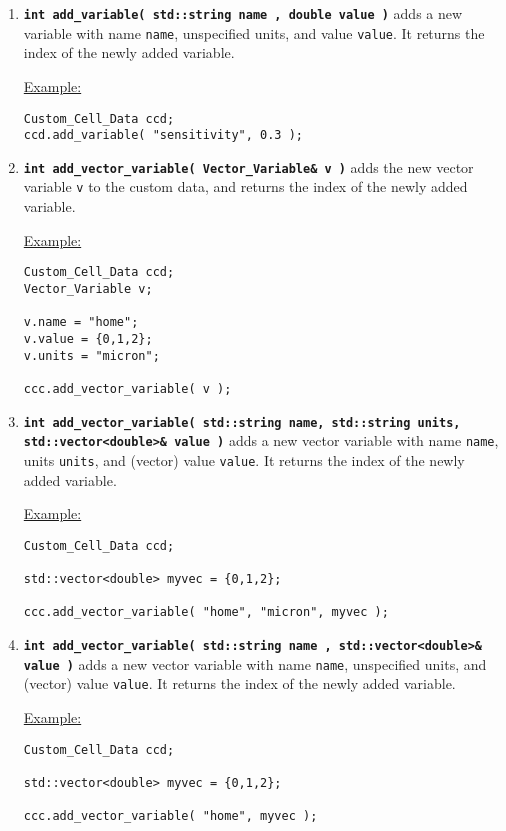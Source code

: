 \documentclass[12pt]{article}
\renewcommand{\v}{\verb}
\newcommand{\smallcode}[1]{\textbf{\texttt{#1}}}
\begin{document}
\begin{enumerate}
\item 
\smallcode{int add\_variable( std::string name , double value )}
adds a new variable with name \v|name|, unspecified units, and value \v|value|. It 
returns the index of the newly added variable. 
       
\underline{Example:} 
\begin{verbatim}
Custom_Cell_Data ccd; 
ccd.add_variable( "sensitivity", 0.3 ); 
\end{verbatim}
   
\item 
\smallcode{int add\_vector\_variable( Vector\_Variable\& v )} adds the new vector variable \v|v| to the 
custom data, and returns the index of the newly added variable. 

\underline{Example:} 
\begin{verbatim}
Custom_Cell_Data ccd; 
Vector_Variable v; 

v.name = "home"; 
v.value = {0,1,2}; 
v.units = "micron"; 

ccc.add_vector_variable( v ); 
\end{verbatim}

\item 
\smallcode{int add\_vector\_variable( std::string name, std::string units, \\
\phantom{int }std::vector<double>\& value )} 
adds a new vector variable with name \v|name|, units \v|units|, and (vector) value \v|value|. It 
returns the index of the newly added variable. 

\underline{Example:} 
\begin{verbatim}
Custom_Cell_Data ccd; 

std::vector<double> myvec = {0,1,2}; 

ccc.add_vector_variable( "home", "micron", myvec ); 
\end{verbatim}

\item 
\smallcode{int add\_vector\_variable( std::string name , std::vector<double>\& value )}
adds a new vector variable with name \v|name|, unspecified units, and (vector) value \v|value|. It 
returns the index of the newly added variable. 
       
\underline{Example:} 
\begin{verbatim}
Custom_Cell_Data ccd; 

std::vector<double> myvec = {0,1,2}; 

ccc.add_vector_variable( "home", myvec ); 
\end{verbatim}


\end{enumerate}
\end{document}
